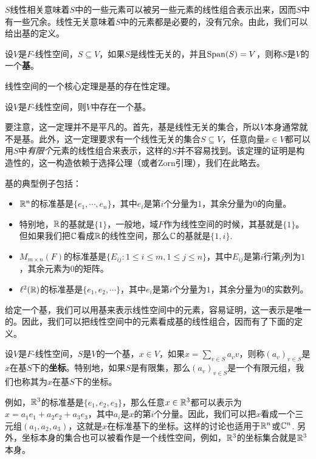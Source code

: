 $S$线性相关意味着$S$中的一些元素可以被另一些元素的线性组合表示出来，因而$S$中有一些冗余。线性无关意味着$S$中的元素都是必要的，没有冗余。由此，我们可以给出基的定义。

\begin{definition}[基]
设$V$是$F$-线性空间，$S\subseteq V$，如果$S$是线性无关的，并且$\operatorname*{Span}(S)=V$，则称$S$是$V$的一个\textbf{基}。
\end{definition}

线性空间的一个核心定理是基的存在性定理。

\begin{theorem}[基的存在性定理]\label{thm:existence-of-basis}
设$V$是$F$-线性空间，则$V$中存在一个基。
\end{theorem}

要注意，这一定理并不是平凡的。首先，基是线性无关的集合，所以$V$本身通常就不是基。此外，这一定理要求有一个线性无关的集合$S\subseteq V$，任意向量$x\in V$都可以用$S$中\emph{有限个}元素的线性组合来表示，这样的$S$并不容易找到。该定理的证明是构造性的，这一构造依赖于选择公理（或者Zorn引理），我们在此略去。

基的典型例子包括：
\begin{itemize}
    \item $\mathbb{R}^n$的标准基是$\{e_1,\cdots,e_n\}$，其中$e_i$是第$i$个分量为$1$，其余分量为$0$的向量。
    \item 特别地，$\mathbb{R}$的基就是$\{1\}$，一般地，域$F$作为线性空间的时候，其基就是$\{1\}$。但如果我们把$\mathbb{C}$看成$\mathbb{R}$的线性空间，那么$\mathbb{C}$的基就是$\{1,i\}$.
    \item $M_{m\times n}(F)$的标准基是$\{E_{ij}:1\leq i\leq m,1\leq j\leq n\}$，其中$E_{ij}$是第$i$行第$j$列为$1$，其余元素为$0$的矩阵。
    \item $\ell^2(\mathbb{R})$的标准基是$\{e_1,e_2,\cdots\}$，其中$e_i$是第$i$个分量为$1$，其余分量为$0$的实数列。
\end{itemize}

给定一个基，我们可以用基来表示线性空间中的元素，容易证明，这一表示是唯一的。因此，我们可以把线性空间中的元素看成基的线性组合，因而有了下面的定义。

\begin{definition}[坐标]
设$V$是$F$-线性空间，$S$是$V$的一个基，$x\in V$，如果$x=\sum_{v\in S} a_v v$，则称$(a_v)_{v\in S}$是$x$在基$S$下的\textbf{坐标}。特别地，如果$S$是有限集，那么$(a_v)_{v\in S}$是一个有限元组，我们也称其为$x$在基$S$下的坐标。
\end{definition}

例如，$\mathbb{R}^3$的标准基是$\{e_1,e_2,e_3\}$，那么任意$x\in\mathbb{R}^3$都可以表示为$x=a_1e_1+a_2e_2+a_3e_3$，其中$a_i$是$x$的第$i$个分量。因此，我们可以把$x$看成一个三元组$(a_1,a_2,a_3)$，这就是$x$在标准基下的坐标。这样的讨论也适用于$\mathbb{R}^n$或$\mathbb{C}^n$. 另外，坐标本身的集合也可以被看作是一个线性空间，例如，$\mathbb{R}^3$的坐标集合就是$\mathbb{R}^3$本身。

